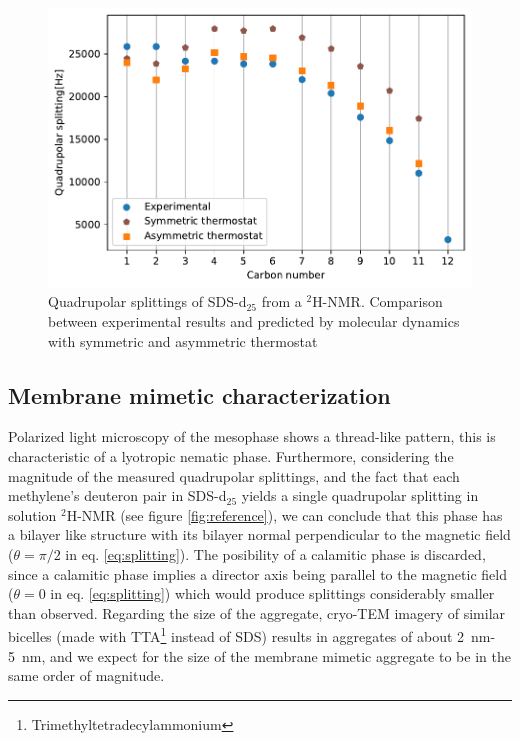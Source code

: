 \documentclass[3p,preprint,review]{elsarticle}
\begin{document}
	\begin{figure}[h]
		\centering
		\includegraphics[width=\columnwidth]{calibration2}
		\caption{Quadrupolar splittings of SDS-d$_{25}$ from a $^2$H-NMR. Comparison
			between experimental results and predicted by molecular dynamics with
			symmetric and asymmetric thermostat}
		\label{fig:2nd_calibration}
	\end{figure}
	
	\subsection{Membrane mimetic characterization}
	\label{sec:characterization}
	
	Polarized light microscopy of the mesophase shows a thread-like pattern, this
	is
	characteristic of a lyotropic nematic phase\cite{dierking2006textures}.
	Furthermore, considering the magnitude of the measured quadrupolar
	splittings, and the fact that each methylene's deuteron pair in SDS-d$_{25}$
	yields
	a
	single quadrupolar splitting in solution $^2$H-NMR (see figure
	\ref{fig:reference}), we can conclude that this phase has a bilayer
	like structure with its bilayer normal perpendicular
	to the magnetic field ($\theta=\pi/2$ in eq. \ref{eq:splitting}). The
	posibility of a calamitic phase is discarded, since a calamitic phase implies a
	director axis being parallel to the magnetic field ($\theta=0$ in eq.
	\ref{eq:splitting}) which would produce splittings considerably smaller than
	observed. Regarding the size of the aggregate, cryo-TEM imagery of similar
  bicelles (made with TTA\footnote{Trimethyltetradecylammonium} instead of SDS)
  results in aggregates of about
  \SI{2}{nm}-\SI{5}{nm}, and we expect for the size of
  the membrane mimetic aggregate to be in the same order of magnitude.\\ 
	
\end{document}
